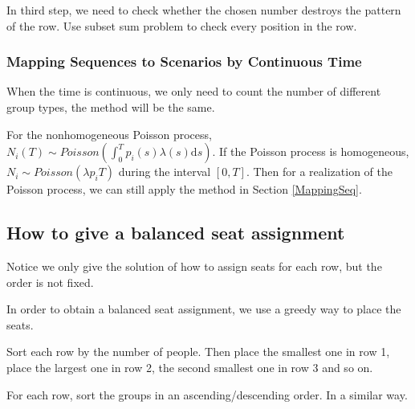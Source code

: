 In third step, we need to check whether the chosen number destroys the pattern of the row. Use subset sum problem to check every position in the row.

\subsubsection{Mapping Sequences to Scenarios by Continuous Time}

When the time is continuous, we only need to count the number of different group types, the method will be the same.

For the nonhomogeneous Poisson process, $N_{i}(T) \sim Poisson (\int_0^{T} p_i(s)\lambda(s) \mathrm{d} s)$. If the Poisson process is homogeneous, $N_{i} \sim Poisson(\lambda p_i T)$ during the interval $[0, T]$. Then for a realization of the Poisson process, we can still apply the method in Section \ref{MappingSeq}.


\subsection{How to give a balanced seat assignment}

Notice we only give the solution of how to assign seats for each row, but the order is not fixed.

In order to obtain a balanced seat assignment, we use a greedy way to place the seats.

Sort each row by the number of people. Then place the smallest one in row 1, place the largest one in row 2, the second smallest one in row 3 and so on. 

For each row, sort the groups in an ascending/descending order. In a similar way.